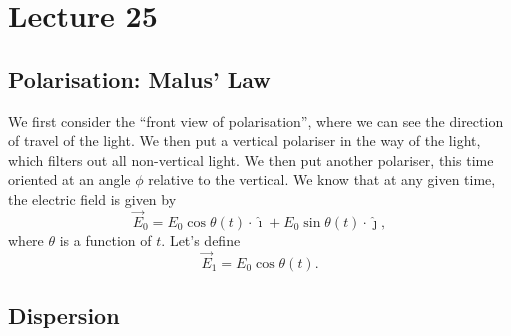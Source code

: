 \documentclass[class=article, crop=false]{standalone}
\begin{document}
  \section{Lecture 25}
  \subsection{Polarisation: Malus' Law}
  We first consider the ``front view of polarisation'', where we can see the direction of travel of the light. We then put a vertical polariser in the way of the light, which filters out all non-vertical light. We then put another polariser, this time oriented at an angle $\phi$ relative to the vertical. We know that at any given time, the electric field is given by
  \[
    \vec{E}_0 = E_0\cos \theta(t)\cdot \hat{\imath} + E_0\sin \theta(t)\cdot \hat{\jmath},
  \]
  where $\theta$ is a function of $t$. Let's define
  \[
    \vec{E}_1 = E_0\cos \theta(t).
  \]
  \subsection{Dispersion}
\end{document}
